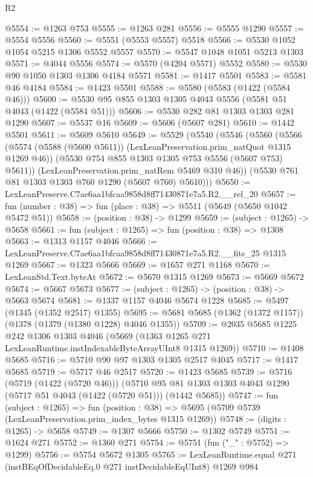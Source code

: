 \begin{lexlean}{R2}
\begin{coremodule}
@5554 := @1263 @753
@5555 := @1263 @281
@5556 := @5555 @1290
@5557 := @5554 @5556
@5560 := @5551 (@5553 @5557) @5518
@5566 := @5530 @1052 @1054 @5215 @1306 @5552 @5557
@5570 := @5547 @1048 @1051 @5213 @1303
@5571 := @4044 @5556
@5574 := @5570 (@4204 @5571) @5552
@5580 := @5530 @90 @1050 @1303 @1306 @4184 @5571
@5581 := @1417 @5501
@5583 := @5581 @46 @4184
@5584 := @1423 @5501
@5588 := @5580 (@5583 (@1422 (@5584 @46)))
@5600 := @5530 @95 @855 @1303 @1305 @4043 @5556 (@5581 @51 @4043 (@1422 (@5584 @51)))
@5606 := @5530 @282 @81 @1303 @1303 @281 @1290
@5607 := @5537 @16
@5609 := @5606 (@5607 @281)
@5610 := @1442 @5501
@5611 := @5609 @5610
@5649 := @5529
    (@5540
      (@5546
        (@5560
          (@5566
            (@5574 (@5588 (@5600 @5611)) (LexLeanPreservation.prim_natQuot @1315 @1269 @46))
            (@5530 @754 @855 @1303 @1305 @753 @5556 (@5607 @753) @5611))
          (LexLeanPreservation.prim_natRem @5469 @310 @46))
        (@5530 @761 @81 @1303 @1303 @760 @1290 (@5607 @760) @5610)))
@5650 := LexLeanPreserve.C7ae6aa1bfcaa9858d8ff71430871e7a5.R2.__rel_20
@5657 := fun (number : @38) => fun (place : @38) => @5511 (@5649 (@5650 @1042 @5472 @51))
@5658 := (position : @38) -> @1299
@5659 := (subject : @1265) -> @5658
@5661 := fun (subject : @1265) => fun (position : @38) => @1308
@5663 := @1313 @1157 @4046
@5666 := LexLeanPreserve.C7ae6aa1bfcaa9858d8ff71430871e7a5.R2.__fits_25 @1315 @1269
@5667 := @1323 @5666
@5669 := @1657 @271 @1168
@5670 := LexLeanStd.Text.byteAt
@5672 := @5670 @1315 @1269
@5673 := @5669 @5672
@5674 := @5667 @5673
@5677 := (subject : @1265) -> (position : @38) -> @5663 @5674
@5681 := @1337 @1157 @4046 @5674 @1228
@5685 := @5497 (@1345 (@1352 @2517) @1355)
@5695 := @5681 @5685 (@1362 (@1372 @1157)) (@1378 (@1379 (@1380 @1228) @4046 @1355))
@5709 := @2035
    @5685
    @1225
    @242
    @1306
    @1303
    @4046
    (@5669 (@1363 @1265 @271 LexLeanRuntime.instIndexableByteArrayUInt8 @1315 @1269))
@5710 := @1408 @5685
@5716 := @5710 @90 @97 @1303 @1305 @2517 @4045
@5717 := @1417 @5685
@5719 := @5717 @46 @2517
@5720 := @1423 @5685
@5739 := @5716
    (@5719 (@1422 (@5720 @46)))
    (@5710 @95 @81 @1303 @1303 @4043 @1290 (@5717 @51 @4043 (@1422 (@5720 @51))) (@1442 @5685))
@5747 := fun (subject : @1265) =>
  fun (position : @38) => @5695 (@5709 @5739 (LexLeanPreservation.prim_index_bytes @1315 @1269))
@5748 := (digits : @1265) -> @5658
@5749 := @1307 @5666
@5750 := @1302 @5749
@5751 := @1624 @271
@5752 := @1360 @271
@5754 := @5751 (fun ("_" : @5752) => @1299)
@5756 := @5754 @5672 @1305
@5765 := LexLeanRuntime.equal @271 (instBEqOfDecidableEq.{0} @271 instDecidableEqUInt8) @1269 @984

\end{coremodule}
\end{lexlean}
